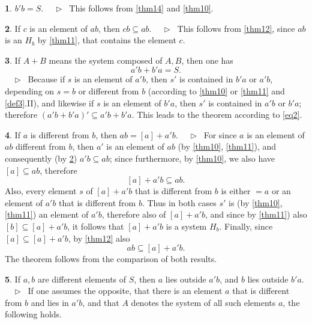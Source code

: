 \documentclass[leqno,hidelinks]{article}
\theoremstyle{definition}
\newtheorem{satz}{\protect\satzname}
\newcommand{\satzname}{}
\renewcommand{\satzname}{\hspace{-4pt}.\ Satz}%
\renewcommand{\satzname}{\hspace{-4pt}.\ Theorem}%
\newcommand\Beweis{\medskip \newline $ \phantom{'.'} \rhd \ $}%
\newcommand\beweis{ $ \phantom{'.'} \rhd \ $}%
\newcommand{\partof}{\subseteq}
\newcommand{\sref}[1]{\underline{\ref{#1}}}%
\begin{document}
\begin{paracol}{2}
\begin{satz}\label{thm15}
$b' b = S$.
\Beweis
This follows from \sref{thm14} and \sref{thm10}.
\end{satz}

\begin{satz}\label{thm16}
If $c$ is an element of $ab$, then $cb \partof ab$.
\Beweis
This follows from \sref{thm12}, since $ab$ is an $H_b$ by \sref{thm11}, that
contains the element $c$.
\end{satz}

\begin{satz}\label{thm17}
If $A + B$ means the system composed of $A, B$, then one has
\[
	a'b + b'a = S.
\]%
\beweis
Because if $s$ is an element of $a'b$, then $s'$ is contained in $b'a$ or $a'b$,
depending on $s = b$ or different from $b$ (according to \sref{thm10} or
\sref{thm11} and \sref{def3}.II), and likewise if $s$ is an element of $b'a$,
then $s'$ is contained in $a'b$ or $b'a$; therefore $(a'b + b'a)' \partof a'b + b'a$.
This leads to the theorem according to \eqref{eq2}.
\end{satz}

\begin{satz}\label{thm18}
If $a$ is different from $b$, then $ab = [a] + a'b$.
\Beweis
For since $a$ is an element of $ab$ different from $b$, then $a'$ is an element
of $ab$ (by \sref{thm10}, \sref{thm11}), and consequently (by \sref{thm16})
$a'b \partof ab$; since furthermore, by \sref{thm10}, we also have $[a]
\partof ab$, therefore
\[
	[a] + a'b \partof ab.
\]
Also, every element $s$ of $[a] + a'b$ that is different from $b$ is either
$= a$ or an element of $a'b$ that is different from $b$. Thus in both cases $s'$
is (by \sref{thm10}, \sref{thm11}) an element of $a'b$, therefore also of
$[a]+ a'b$, and since by \sref{thm11}) also $[b] \partof [a] + a'b$, it follows
that $[a] + a'b$ is a system $H_b$. Finally, since $[a] \partof [a] + a'b$, by
\sref{thm12} also
\[
	ab \partof [a] + a' b.
\]
The theorem follows from the comparison of both results.
\end{satz}

\newpage

\begin{satz}\label{thm19}
If $a, b$ are different elements of $S$, then $a$ lies outside $a'b$, and $b$ lies
outside $b'a$.
\Beweis
If one assumes the opposite, that there is an element $a$ that is different from
$b$ and lies in $a'b$, and that $A$ denotes the system of all such elements $a$,
the following holds.


\end{satz}
\end{paracol}
\end{document}
